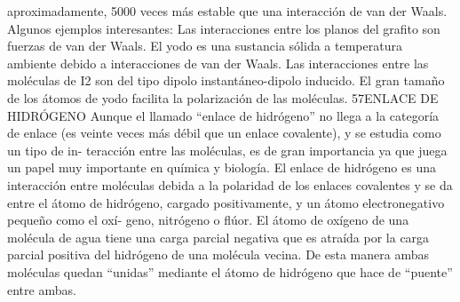 \documentclass[tikz,border=2mm]{standalone}
\begin{document}
aproximadamente, 5000 veces más estable que una interacción de van der Waals. Algunos ejemplos interesantes: Las interacciones entre los planos del grafito son fuerzas de van der Waals. El yodo es una sustancia sólida a temperatura ambiente debido a interacciones de van der Waals. Las interacciones entre las moléculas de I2 son del tipo dipolo instantáneo-dipolo inducido. El gran tamaño de los átomos de yodo facilita la polarización de las moléculas. 57ENLACE DE HIDRÓGENO Aunque el llamado “enlace de hidrógeno” no llega a la categoría de enlace (es veinte veces más débil que un enlace covalente), y se estudia como un tipo de in- teracción entre las moléculas, es de gran importancia ya que juega un papel muy importante en química y biología. El enlace de hidrógeno es una interacción entre moléculas debida a la polaridad de los enlaces covalentes y se da entre el átomo de hidrógeno, cargado positivamente, y un átomo electronegativo pequeño como el oxí- geno, nitrógeno o flúor. El átomo de oxígeno de una molécula de agua tiene una carga parcial negativa que es atraída por la carga parcial positiva del hidrógeno de una molécula vecina. De esta manera ambas moléculas quedan “unidas” mediante el átomo de hidrógeno que hace de “puente” entre ambas.
\end{document}
